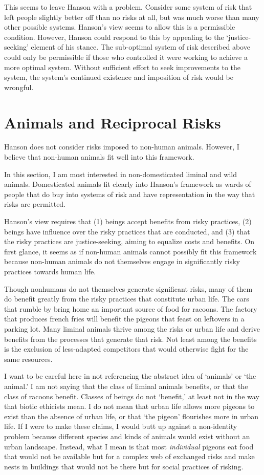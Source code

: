 This seems to leave Hanson with a problem. Consider some system of risk that
left people slightly better off than no risks at all, but was much worse than
many other possible systems. Hanson’s view seems to allow this is a permissible
condition. However, Hanson could respond to this by appealing to the
‘justice-seeking’ element of his stance. The sub-optimal system of risk
described above could only be permissible if those who controlled it were
working to achieve a more optimal system. Without sufficient effort to seek
improvements to the system, the system’s continued existence and imposition of
risk would be wrongful.

\section{Animals and Reciprocal Risks}

Hanson does not consider risks imposed to non-human animals. However, I believe
that non-human animals fit well into this framework.

In this section, I am most interested in non-domesticated liminal and wild
animals. Domesticated animals fit clearly into Hanson’s framework as wards of
people that do buy into systems of risk and have representation in the way that
risks are permitted.

Hanson’s view requires that (1) beings accept benefits from risky practices,
(2) beings have influence over the risky practices that are conducted, and (3)
that the risky practices are justice-seeking, aiming to equalize costs and
benefits.  On first glance, it seems as if non-human animals cannot possibly
fit this framework because non-human animals do not themselves engage in
significantly risky practices towards human life.

Though nonhumans do not themselves generate significant risks, many of them do
benefit greatly from the risky practices that constitute urban life. The cars
that rumble by bring home an important source of food for racoons. The factory
that produces french fries will benefit the pigeons that feast on leftovers in
a parking lot.\autocite[68]{zoopolis} Many liminal animals thrive among the risks
or urban life and derive benefits from the processes that generate that risk.
Not least among the benefits is the exclusion of less-adapted competitors that
would otherwise fight for the same resources.

I want to be careful here in not referencing the abstract idea of ‘animals’ or
‘the animal.’ I am not saying that the class of liminal animals benefits, or
that the class of racoons benefit. Classes of beings do not ‘benefit,’ at least
not in the way that biotic ethicists mean. I do not mean that urban life allows
more pigeons to exist than the absence of urban life, or that ‘the pigeon’
flourishes more in urban life. If I were to make these claims, I would butt up
against a non-identity problem because different species and kinds of animals
would exist without an urban landscape. Instead, what I mean is that most
\emph{individual} pigeons eat food that would not be available but for a complex
web of exchanged risks and make nests in buildings that would not be there but
for social practices of risking.

